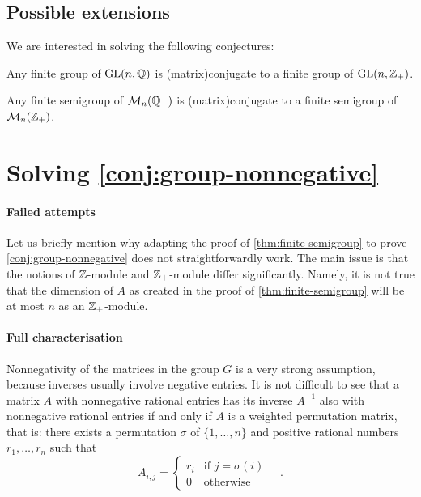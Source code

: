 \subsection{Possible extensions}

We are interested in solving the following conjectures:

\begin{conjecture}
  \label{conj:group-nonnegative}
  Any finite group of $\GL[n]{\Rat}$ is \kl(matrix){conjugate} to a finite group of
  $\GL[n]{\Int_+}$.
\end{conjecture}

\begin{conjecture}
  \label{conj:semigroup-nonnegative}
  Any finite semigroup of $\Mat[n]{\Rat_+}$ is \kl(matrix){conjugate} to a finite semigroup of
  $\Mat[n]{\Int_+}$.
\end{conjecture}

\section{Solving \cref{conj:group-nonnegative}}

\paragraph*{Failed attempts} Let us briefly mention why adapting the proof of
\cref{thm:finite-semigroup} to prove \cref{conj:group-nonnegative} does not
straightforwardly work. The main issue is that the notions of $\Int$-module and
$\Int_+$-module differ significantly. Namely, it is not true that the dimension
of $A$ as created in the proof of \cref{thm:finite-semigroup} will be at most
$n$ as an $\Int_+$-module.

\paragraph*{Full characterisation}
Nonnegativity of the matrices in the group $G$ is a very strong 
assumption, because inverses usually involve negative entries.
It is not difficult to see that a matrix $A$ with nonnegative 
rational entries has its inverse $A^{-1}$ also with nonnegative
rational entries if and only if $A$ is a weighted permutation matrix, 
that is: there exists a permutation $\sigma$ of $\{1, \ldots, n\}$ and
positive rational numbers $r_1, \ldots, r_n$ such that
\begin{equation}
  A_{i,j} = \begin{cases}
    r_i & \text{if } j = \sigma(i) \\
    0 & \text{otherwise}
  \end{cases}
  \quad .
\end{equation}

